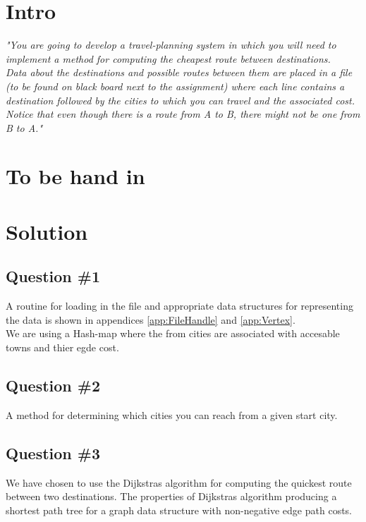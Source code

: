 \section{Intro}
\label{sec:intro}
\textit{"You are going to develop a travel-planning system in which you will need to implement a method for computing the cheapest route between destinations. \\
Data about the destinations and possible routes between them are placed in a file (to be found on black board next to the assignment) where each line contains a destination followed by the cities to which you can travel and the associated cost. \\
Notice that even though there is a route from A to B, there might not be one from B to A."}

\section{To be hand in}


\section{Solution}
\subsection{Question \#1}
A routine for loading in the file and appropriate data structures for representing the data is shown in appendices \ref{app:FileHandle} and \ref{app:Vertex}.\\
We are using a Hash-map where the from cities are associated with accesable towns and thier egde cost.



\subsection{Question \#2}
A method for determining which cities you can reach from a given start city.


\subsection{Question \#3}
We have chosen to use the Dijkstras algorithm for computing the quickest route between two destinations. The properties of Dijkstras algorithm producing a shortest path tree for a graph data structure with non-negative edge path costs. \\

